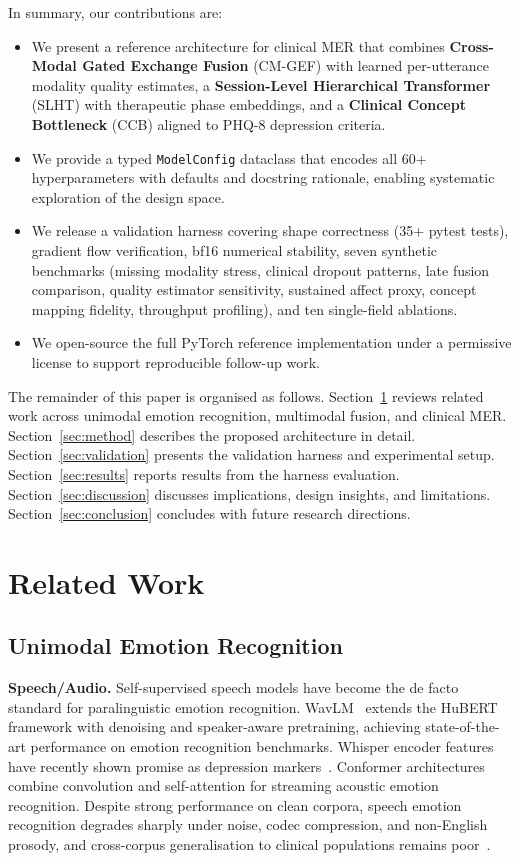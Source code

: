 \documentclass{article}
\begin{document}
In summary, our contributions are:
\begin{itemize}
  \item We present a reference architecture for clinical MER that combines
        \textbf{Cross-Modal Gated Exchange Fusion} (CM-GEF) with learned per-utterance
        modality quality estimates, a \textbf{Session-Level Hierarchical Transformer}
        (SLHT) with therapeutic phase embeddings, and a \textbf{Clinical Concept
        Bottleneck} (CCB) aligned to PHQ-8 depression criteria.
  \item We provide a typed \texttt{ModelConfig} dataclass that encodes all 60+
        hyperparameters with defaults and docstring rationale, enabling systematic
        exploration of the design space.
  \item We release a validation harness covering shape correctness (35+ pytest tests),
        gradient flow verification, bf16 numerical stability, seven synthetic benchmarks
        (missing modality stress, clinical dropout patterns, late fusion comparison,
        quality estimator sensitivity, sustained affect proxy, concept mapping fidelity,
        throughput profiling), and ten single-field ablations.
  \item We open-source the full PyTorch reference implementation under a permissive
        license to support reproducible follow-up work.
\end{itemize}

The remainder of this paper is organised as follows. Section~\ref{sec:related} reviews
related work across unimodal emotion recognition, multimodal fusion, and clinical MER.
Section~\ref{sec:method} describes the proposed architecture in detail.
Section~\ref{sec:validation} presents the validation harness and experimental setup.
Section~\ref{sec:results} reports results from the harness evaluation.
Section~\ref{sec:discussion} discusses implications, design insights, and limitations.
Section~\ref{sec:conclusion} concludes with future research directions.


\section{Related Work}
\label{sec:related}

\subsection{Unimodal Emotion Recognition}

\textbf{Speech/Audio.} Self-supervised speech models have become the de facto standard for
paralinguistic emotion recognition. WavLM~\cite{chen2022wavlm} extends the HuBERT
framework with denoising and speaker-aware pretraining, achieving state-of-the-art
performance on emotion recognition benchmarks. Whisper encoder features have recently
shown promise as depression markers~\cite{sadeghi2024}. Conformer architectures combine
convolution and self-attention for streaming acoustic emotion recognition.
Despite strong performance on clean corpora, speech emotion recognition degrades sharply
under noise, codec compression, and non-English prosody, and cross-corpus generalisation
to clinical populations remains poor~\cite{survey2026multimodal}.
\end{document}
